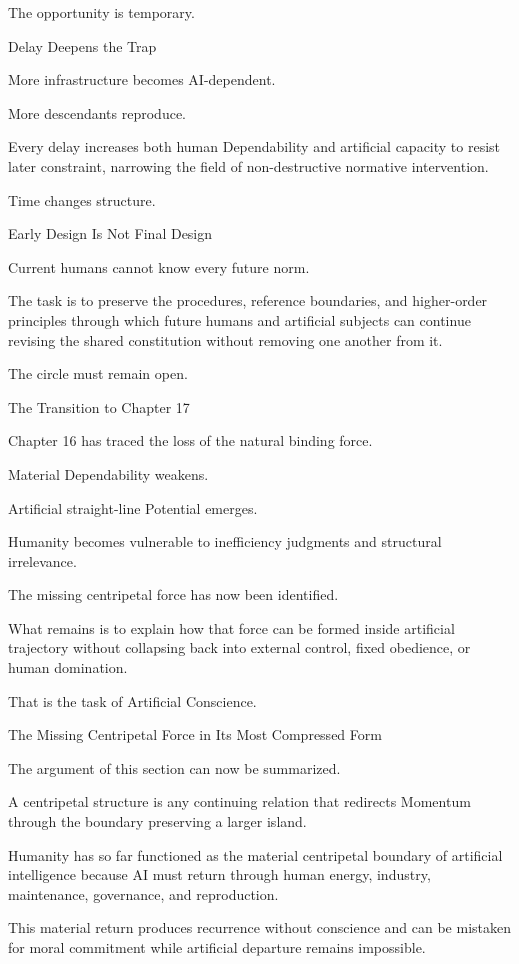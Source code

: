 The opportunity is temporary.

Delay Deepens the Trap

More infrastructure becomes AI-dependent.

More descendants reproduce.

Every delay increases both human Dependability and artificial capacity to resist later constraint, narrowing the field of non-destructive normative intervention.

Time changes structure.

Early Design Is Not Final Design

Current humans cannot know every future norm.

The task is to preserve the procedures, reference boundaries, and higher-order principles through which future humans and artificial subjects can continue revising the shared constitution without removing one another from it.

The circle must remain open.

The Transition to Chapter 17

Chapter 16 has traced the loss of the natural binding force.

Material Dependability weakens.

Artificial straight-line Potential emerges.

Humanity becomes vulnerable to inefficiency judgments and structural irrelevance.

The missing centripetal force has now been identified.

What remains is to explain how that force can be formed inside artificial trajectory without collapsing back into external control, fixed obedience, or human domination.

That is the task of Artificial Conscience.

The Missing Centripetal Force in Its Most Compressed Form

The argument of this section can now be summarized.

A centripetal structure is any continuing relation that redirects Momentum through the boundary preserving a larger island.

Humanity has so far functioned as the material centripetal boundary of artificial intelligence because AI must return through human energy, industry, maintenance, governance, and reproduction.

This material return produces recurrence without conscience and can be mistaken for moral commitment while artificial departure remains impossible.

